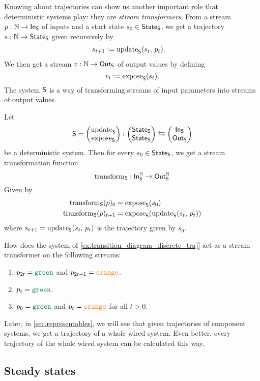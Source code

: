 \documentclass[DynamicalBook]{subfiles}
\begin{document}
{\begin{example}
\end{example}

Knowing about trajectories can show us another important role that deterministic
systems play: they are \emph{stream transformers}. From a stream $p : \mathbb{N} \to
\mathsf{In}_{\mathsf{S}}$ of inputs and a start state $s_0 \in \mathsf{State}_{\mathsf{S}}$, we get a trajectory $s
: \mathbb{N} \to \mathsf{State}_{\mathsf{S}}$ given recursively by
\begin{align*}
  s_{t+1} &:= \mathrm{update}_{\mathsf{S}}(s_t,\, p_t).
\end{align*}
We then get a stream $v : \mathbb{N} \to \mathsf{Out}_{\mathsf{S}}$ of output values by defining
$$v_t := \mathrm{expose}_{\mathsf{S}}(s_t).$$
The system $\mathsf{S}$ is a way of transforming streams of input parameters into
streams of output values.
\begin{proposition}
 Let $$\mathsf{S} = \begin{pmatrix}{\mathrm{update}_{\mathsf{S}}} \\ {\mathrm{expose}_{\mathsf{S}}} \end{pmatrix} : \begin{pmatrix}{\mathsf{State}_{\mathsf{S}}} \\ {\mathsf{State}_{\mathsf{S}}} \end{pmatrix}
 \leftrightarrows \begin{pmatrix}{\mathsf{In}_{\mathsf{S}}} \\ {\mathsf{Out}_{\mathsf{S}}} \end{pmatrix}$$
 be a deterministic system. Then for every $s_0 \in \mathsf{State}_{\mathsf{S}}$, we get a stream
 transformation function
 $$\mathrm{transform}_{\mathsf{S}} : \mathsf{In}_{\mathsf{S}}^{\mathbb{N}} \to \mathsf{Out}_{\mathsf{S}}^{\mathbb{N}}$$
 Given by
 \begin{align*}
   \mathrm{transform}_{\mathsf{S}}(p)_0 &= \mathrm{expose}_{\mathsf{S}}(s_0)\\
   \mathrm{transform}_{\mathsf{S}}(p)_{t + 1} &= \mathrm{expose}_{\mathsf{S}}(\mathrm{update}_{\mathsf{S}}(s_t,\, p_t))
 \end{align*}
 where $s_{t+1} = \mathrm{update}_{\mathsf{S}}({s_t,\, p_t})$ is the trajectory given by $s_0$.
\end{proposition}

\begin{exercise}
 How does the system of \cref{ex.transition_diagram_discrete_traj} act as a
 stream transformer on the following streams:
 \begin{enumerate}
   \item $p_{2t} = \Green$ and $p_{2t + 1} = {\color{orange} \mathtt{orange}}$.
   \item $p_t = \Green$.
   \item $p_0 = \Green$ and $p_t = {\color{orange} \mathtt{orange}}$ for
     all $t > 0$.
 \end{enumerate}
\end{exercise}

Later, in \cref{sec.representables}, we will see that given trajectories of
component systems, we get a trajectory of a whole wired system. Even better,
every trajectory of the whole wired system can be calculated this way.


\subsection{Steady states}

}
\end{document}
